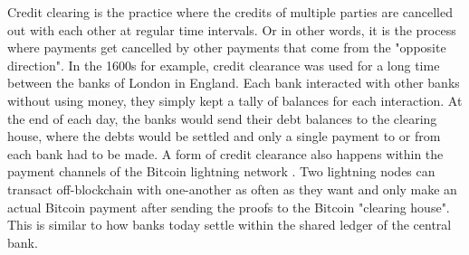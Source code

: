 \documentclass{article}
\begin{document}
Credit clearing is the practice where the credits of multiple parties are cancelled out with each other at regular time intervals. Or in other words, it is the process where payments get cancelled by other payments that come from the "opposite direction". In the 1600s for example,  credit clearance was used for a long time between the banks of London in England. Each bank interacted with other banks without using money, they simply kept a tally of balances for each interaction. At the end of each day, the banks would send their debt balances to the clearing house, where the debts would be settled and only a single payment to or from each bank had to be made. A form of credit clearance also happens within the payment channels of the Bitcoin lightning network \cite{poon_bitcoin_2016}. Two lightning nodes can transact off-blockchain with one-another as often as they want and only make an actual Bitcoin payment after sending the proofs to the Bitcoin "clearing house". This is similar to how banks today settle within the shared ledger of the central bank.
\end{document}
